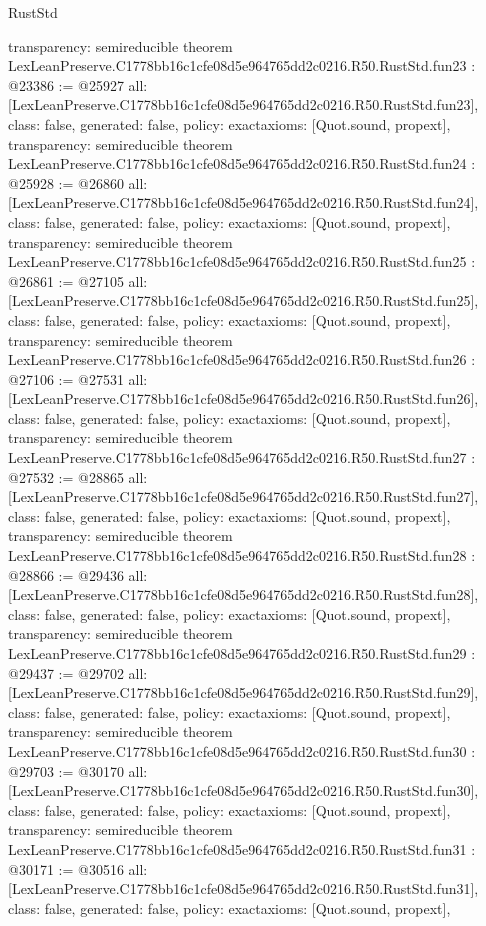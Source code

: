 \begin{lexlean}{RustStd}
\begin{coremodule}
{  transparency: semireducible
}
theorem LexLeanPreserve.C1778bb16c1cfe08d5e964765dd2c0216.R50.RustStd.fun23 : @23386 := @25927 {
  all: [LexLeanPreserve.C1778bb16c1cfe08d5e964765dd2c0216.R50.RustStd.fun23],
  class: false,
  generated: false,
  policy: exact{axioms: [Quot.sound, propext]},
  transparency: semireducible
}
theorem LexLeanPreserve.C1778bb16c1cfe08d5e964765dd2c0216.R50.RustStd.fun24 : @25928 := @26860 {
  all: [LexLeanPreserve.C1778bb16c1cfe08d5e964765dd2c0216.R50.RustStd.fun24],
  class: false,
  generated: false,
  policy: exact{axioms: [Quot.sound, propext]},
  transparency: semireducible
}
theorem LexLeanPreserve.C1778bb16c1cfe08d5e964765dd2c0216.R50.RustStd.fun25 : @26861 := @27105 {
  all: [LexLeanPreserve.C1778bb16c1cfe08d5e964765dd2c0216.R50.RustStd.fun25],
  class: false,
  generated: false,
  policy: exact{axioms: [Quot.sound, propext]},
  transparency: semireducible
}
theorem LexLeanPreserve.C1778bb16c1cfe08d5e964765dd2c0216.R50.RustStd.fun26 : @27106 := @27531 {
  all: [LexLeanPreserve.C1778bb16c1cfe08d5e964765dd2c0216.R50.RustStd.fun26],
  class: false,
  generated: false,
  policy: exact{axioms: [Quot.sound, propext]},
  transparency: semireducible
}
theorem LexLeanPreserve.C1778bb16c1cfe08d5e964765dd2c0216.R50.RustStd.fun27 : @27532 := @28865 {
  all: [LexLeanPreserve.C1778bb16c1cfe08d5e964765dd2c0216.R50.RustStd.fun27],
  class: false,
  generated: false,
  policy: exact{axioms: [Quot.sound, propext]},
  transparency: semireducible
}
theorem LexLeanPreserve.C1778bb16c1cfe08d5e964765dd2c0216.R50.RustStd.fun28 : @28866 := @29436 {
  all: [LexLeanPreserve.C1778bb16c1cfe08d5e964765dd2c0216.R50.RustStd.fun28],
  class: false,
  generated: false,
  policy: exact{axioms: [Quot.sound, propext]},
  transparency: semireducible
}
theorem LexLeanPreserve.C1778bb16c1cfe08d5e964765dd2c0216.R50.RustStd.fun29 : @29437 := @29702 {
  all: [LexLeanPreserve.C1778bb16c1cfe08d5e964765dd2c0216.R50.RustStd.fun29],
  class: false,
  generated: false,
  policy: exact{axioms: [Quot.sound, propext]},
  transparency: semireducible
}
theorem LexLeanPreserve.C1778bb16c1cfe08d5e964765dd2c0216.R50.RustStd.fun30 : @29703 := @30170 {
  all: [LexLeanPreserve.C1778bb16c1cfe08d5e964765dd2c0216.R50.RustStd.fun30],
  class: false,
  generated: false,
  policy: exact{axioms: [Quot.sound, propext]},
  transparency: semireducible
}
theorem LexLeanPreserve.C1778bb16c1cfe08d5e964765dd2c0216.R50.RustStd.fun31 : @30171 := @30516 {
  all: [LexLeanPreserve.C1778bb16c1cfe08d5e964765dd2c0216.R50.RustStd.fun31],
  class: false,
  generated: false,
  policy: exact{axioms: [Quot.sound, propext]},
}
\end{coremodule}
\end{lexlean}

